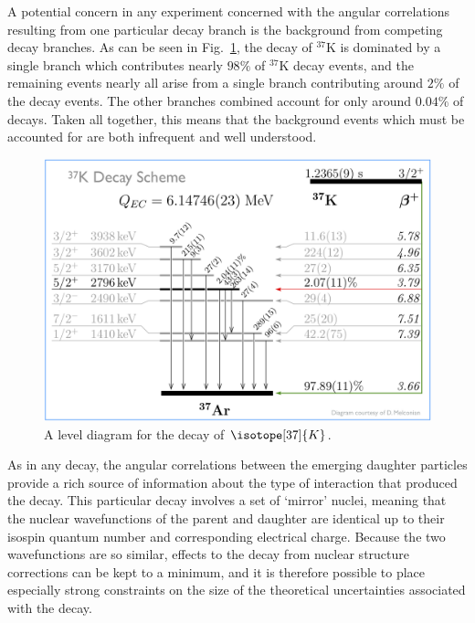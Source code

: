 A potential concern in any experiment concerned with the angular correlations resulting from one particular decay branch is the background from competing decay branches.  As can be seen in Fig.~\ref{fig:nuclearleveldiagram}, the decay of $^{37}\textrm{K}$ is dominated by a single branch which contributes nearly $98\%$ of $^{37}\textrm{K}$ decay events, and the remaining events nearly all arise from a single branch contributing around $2\%$ of the decay events.  The other branches combined account for only around $0.04\%$ of decays.  Taken all together, this means that the background events which must be accounted for are both infrequent and well understood.

\begin{figure}[h!tb]
	\centering
	\includegraphics[width=.999\linewidth]
	{Figures/NuclearLevelDiagram.png}
	\caption{A level diagram for the decay of $\isotope[37]{K}$.}	
	\label{fig:nuclearleveldiagram}
\end{figure}


As in any decay, the angular correlations between the emerging daughter particles provide a rich source of information about the type of interaction that produced the decay.  
This particular decay involves a set of `mirror' nuclei, meaning that the nuclear wavefunctions of the parent and daughter are identical up to their isospin quantum number and corresponding electrical charge.  Because the two wavefunctions are so similar, effects to the decay from nuclear structure corrections can be kept to a minimum, and it is therefore possible to place especially strong constraints on the size of the theoretical uncertainties associated with the decay.  



